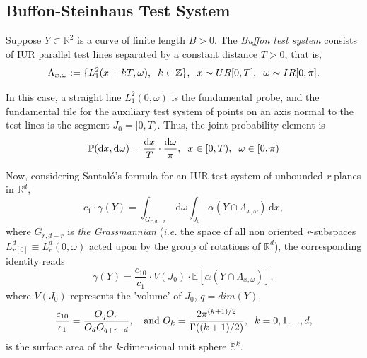 \subsection{Buffon-Steinhaus Test System}

Suppose $Y\subset \mathbb{R}^2$ is a curve  of finite length $B>0$. The \textit{Buffon test system} consists of IUR parallel test lines separated by a constant distance $T>0$, that is,
\begin{equation*}
    \Lambda_{x,\omega} := \{ L_1^2(x+kT,\omega), \hspace{2mm} k\in \mathbb{Z} \}, \hspace{2mm} x\sim UR[0,T], \hspace{2mm} \omega \sim IR[0,\pi].
\end{equation*}

In this case, a straight line $L_1^2(0,\omega)$ is the fundamental probe, and the fundamental tile for the auxiliary test system of points on an axis normal to the test lines is the segment $J_0=[0,T)$. Thus, the joint probability element is
\begin{equation*}
    \mathbb{P}(\mathrm{d}x,\mathrm{d}\omega)=\frac{\mathrm{d}x}{T}\cdot \frac{\mathrm{d}\omega}{\pi}, \hspace{2mm} x\in [0,T), \hspace{2mm} \omega \in [0,\pi)
\end{equation*}

Now, considering Santaló's formula for an IUR test system of unbounded \textit{r}-planes in $\mathbb{R}^d$,
\begin{equation*}
    c_1\cdot \gamma(Y) = \int_{G_{r,d-r}}\,\mathrm{d}\omega \int_{J_0} \alpha(Y\cap \Lambda_{x,\omega})\,\mathrm{d}x,
\end{equation*}
where $G_{r,d-r}$ is \textit{the Grassmannian} (\textit{i.e.} the space of all non oriented \textit{r}-subspaces $L_{r[0]}^d\equiv L_r^d(0,\omega)$ acted upon by the group of rotations of $\mathbb{R}^d$), the corresponding identity reads
\begin{equation*}
    \gamma(Y) = \frac{c_{10}}{c_1}\cdot V(J_0)\cdot \mathbb{E}[\alpha(Y\cap \Lambda_{x,\omega})],
\end{equation*}
where $V(J_0)$ represents the 'volume' of $J_0$, $q=dim(Y)$,
\begin{equation*}
    \frac{c_{10}}{c_1} = \frac{O_q O_r}{O_d O_{q+r-d}},
\quad
\mathrm{ and }\ 
    O_k = \frac{2\pi^{(k+1)/2}}{\Gamma((k+1)/2)}, \hspace{2mm} k=0,1,...,d,
\end{equation*}
is the surface area of the \textit{k}-dimensional unit sphere $\mathbb{S}^k$.\\

